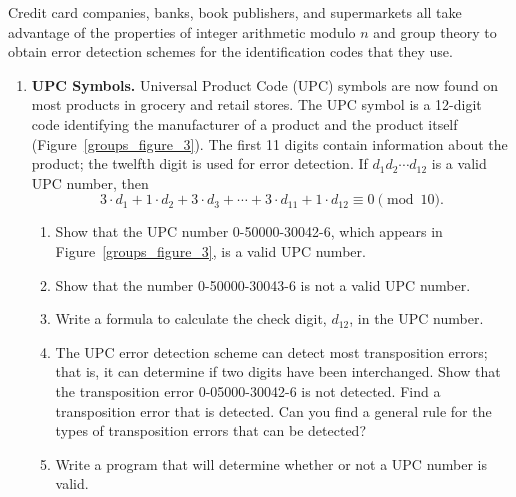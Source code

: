  
{\small
Credit card companies, banks, book publishers, and supermarkets all
take advantage of the properties of integer arithmetic modulo $n$ and
group theory to obtain error detection schemes for the identification
codes that they use. 
\begin{enumerate}
 


\item
{\bf UPC Symbols.}
Universal Product
Code (UPC) symbols are now found on most
products in grocery and retail stores. The UPC symbol is a 12-digit
code identifying the manufacturer of a product and the product itself
(Figure~\ref{groups_figure_3}). The first 11 digits contain information about the
product; the twelfth digit is used for error detection. If $d_1 d_2
\cdots d_{12}$ is a valid UPC number, then  
\[
3 \cdot d_1 + 1 \cdot d_2 + 3 \cdot d_3 + \cdots + 3 \cdot
d_{11} + 1 \cdot d_{12} \equiv 0 \pmod{10}.
\]
\begin{enumerate}
 
\item
Show that the UPC number  0-50000-30042-6, which appears in
Figure~\ref{groups_figure_3}, is a valid UPC number. 
 
\item
Show that the number 0-50000-30043-6 is not a valid UPC number.
 
\item
Write a  formula to calculate the check digit, $d_{12}$, in the UPC number. 
 
\item
The  UPC error detection scheme can detect most transposition errors; that is, it can determine if two digits have been interchanged.  Show that the transposition error 0-05000-30042-6 is not detected.  Find a transposition error that is detected.  Can you find a general rule for the types of transposition errors that can be detected?
 
\item
Write a program that will determine whether or not a UPC number is valid. 
 
\end{enumerate}
 

\end{enumerate}}
